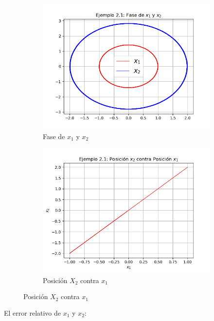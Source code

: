 \documentclass[a4paper]{article}
\begin{document}
\pagebreak
\begin{figure}[ht!]
\begin{subfigure}{0.6\textwidth}
  \centering
  \includegraphics[width=\linewidth]{ejemplo_2_1_3.png}
   \caption{Fase de $x_1$ y $x_2$}
\end{subfigure}
\begin{subfigure}{0.6\textwidth}
  \centering
  \includegraphics[width=\linewidth]{ejemplo_2_1_2.png}
  \caption{Posición $X_2$ contra $x_1$}
\end{subfigure}
\end{figure}

El error relativo de $x_1$ y $x_2$:
\end{document}
